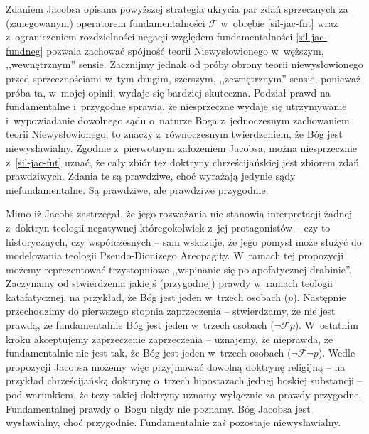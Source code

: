 Zdaniem Jacobsa opisana powyższej strategia ukrycia par zdań sprzecznych za (zanegowanym) operatorem fundamentalności $\mathscr{F}$ w~obrębie \ref{sil-jac-fnt} wraz z~ograniczeniem rozdzielności negacji względem fundamentalności \eqref{sil-jac-fundneg} pozwala zachować spójność teorii Niewysłowionego w~węższym, ,,wewnętrznym'' sensie. Zacznijmy jednak od próby obrony teorii niewysłowionego przed sprzecznościami w~tym drugim, szerszym, ,,zewnętrznym'' sensie, ponieważ próba ta, w~mojej opinii, wydaje się bardziej skuteczna. Podział prawd na fundamentalne i~przygodne sprawia, że niesprzeczne wydaje się utrzymywanie i~wypowiadanie dowolnego sądu o~naturze Boga z~jednoczesnym zachowaniem teorii Niewysłowionego, to znaczy z~równoczesnym twierdzeniem, że Bóg jest niewysławialny. Zgodnie z~pierwotnym założeniem Jacobsa, można niesprzecznie z~\ref{sil-jac-fnt} uznać, że cały zbiór tez doktryny chrześcijańskiej jest zbiorem zdań prawdziwych. Zdania te są prawdziwe, choć wyrażają jedynie sądy niefundamentalne. Są prawdziwe, ale prawdziwe przygodnie.

Mimo iż Jacobs zastrzegał, że jego rozważania nie stanowią interpretacji żadnej z~doktryn teologii negatywnej któregokolwiek z~jej protagonistów -- czy to historycznych, czy współczesnych -- sam wskazuje, że jego pomysł może służyć do modelowania teologii Pseudo-Dionizego Areopagity. W~ramach tej propozycji możemy reprezentować trzystopniowe ,,wspinanie się po apofatycznej drabinie''. Zaczynamy od stwierdzenia jakiejś (przygodnej) prawdy w~ramach teologii katafatycznej, na przykład, że Bóg jest jeden w~trzech osobach ($p$). Następnie przechodzimy do pierwszego stopnia zaprzeczenia -- stwierdzamy, że nie jest prawdą, że fundamentalnie Bóg jest jeden w~trzech osobach ($\neg \mathscr{F}p$). W~ostatnim kroku akceptujemy zaprzeczenie zaprzeczenia -- uznajemy, że nieprawda, że fundamentalnie nie jest tak, że Bóg jest jeden w~trzech osobach ($\neg \mathscr{F} \neg p$). Wedle propozycji Jacobsa możemy więc przyjmować dowolną doktrynę religijną -- na przykład chrześcijańską doktrynę o~trzech hipostazach jednej boskiej substancji -- pod warunkiem, że tezy takiej doktryny uznamy wyłącznie za prawdy przygodne. Fundamentalnej prawdy o~Bogu nigdy nie poznamy. Bóg Jacobsa jest wysławialny, choć przygodnie. Fundamentalnie zaś pozostaje niewysławialny.

